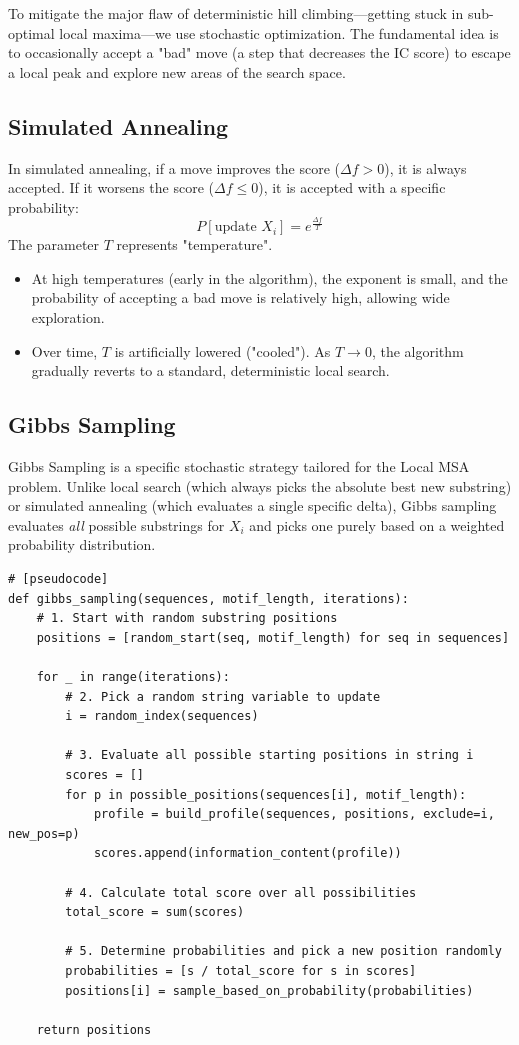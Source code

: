 \documentclass[11pt, a4paper]{article}
\begin{document}
To mitigate the major flaw of deterministic hill climbing—getting stuck in sub-optimal local maxima—we use stochastic optimization. The fundamental idea is to occasionally accept a "bad" move (a step that decreases the IC score) to escape a local peak and explore new areas of the search space.

\subsection{Simulated Annealing}
In simulated annealing, if a move improves the score ($\Delta f > 0$), it is always accepted. If it worsens the score ($\Delta f \leq 0$), it is accepted with a specific probability:
\[ P[\text{update } X_i] = e^{\frac{\Delta f}{T}} \]
The parameter $T$ represents "temperature". 
\begin{itemize}
    \item At high temperatures (early in the algorithm), the exponent is small, and the probability of accepting a bad move is relatively high, allowing wide exploration.
    \item Over time, $T$ is artificially lowered ("cooled"). As $T \to 0$, the algorithm gradually reverts to a standard, deterministic local search.
\end{itemize}

\subsection{Gibbs Sampling}
Gibbs Sampling is a specific stochastic strategy tailored for the Local MSA problem. Unlike local search (which always picks the absolute best new substring) or simulated annealing (which evaluates a single specific delta), Gibbs sampling evaluates \textit{all} possible substrings for $X_i$ and picks one purely based on a weighted probability distribution.

\begin{verbatim}
# [pseudocode]
def gibbs_sampling(sequences, motif_length, iterations):
    # 1. Start with random substring positions
    positions = [random_start(seq, motif_length) for seq in sequences]
    
    for _ in range(iterations):
        # 2. Pick a random string variable to update
        i = random_index(sequences)
        
        # 3. Evaluate all possible starting positions in string i
        scores = []
        for p in possible_positions(sequences[i], motif_length):
            profile = build_profile(sequences, positions, exclude=i, new_pos=p)
            scores.append(information_content(profile))
        
        # 4. Calculate total score over all possibilities
        total_score = sum(scores)
        
        # 5. Determine probabilities and pick a new position randomly
        probabilities = [s / total_score for s in scores]
        positions[i] = sample_based_on_probability(probabilities)
        
    return positions
\end{verbatim}
\end{document}
